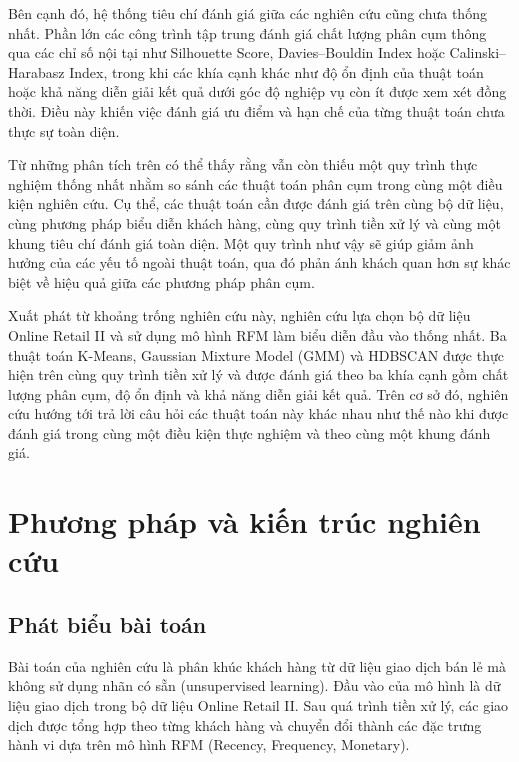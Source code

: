 \documentclass[12pt]{ai_conquer2026}
\begin{document}
Bên cạnh đó, hệ thống tiêu chí đánh giá giữa các nghiên cứu cũng chưa thống nhất. Phần lớn các công trình tập trung đánh giá chất lượng phân cụm thông qua các chỉ số nội tại như Silhouette Score, Davies--Bouldin Index hoặc Calinski--Harabasz Index, trong khi các khía cạnh khác như độ ổn định của thuật toán hoặc khả năng diễn giải kết quả dưới góc độ nghiệp vụ còn ít được xem xét đồng thời. Điều này khiến việc đánh giá ưu điểm và hạn chế của từng thuật toán chưa thực sự toàn diện.

Từ những phân tích trên có thể thấy rằng vẫn còn thiếu một quy trình thực nghiệm thống nhất nhằm so sánh các thuật toán phân cụm trong cùng một điều kiện nghiên cứu. Cụ thể, các thuật toán cần được đánh giá trên cùng bộ dữ liệu, cùng phương pháp biểu diễn khách hàng, cùng quy trình tiền xử lý và cùng một khung tiêu chí đánh giá toàn diện. Một quy trình như vậy sẽ giúp giảm ảnh hưởng của các yếu tố ngoài thuật toán, qua đó phản ánh khách quan hơn sự khác biệt về hiệu quả giữa các phương pháp phân cụm.

Xuất phát từ khoảng trống nghiên cứu này, nghiên cứu lựa chọn bộ dữ liệu Online Retail II và sử dụng mô hình RFM làm biểu diễn đầu vào thống nhất. Ba thuật toán K-Means, Gaussian Mixture Model (GMM) và HDBSCAN được thực hiện trên cùng quy trình tiền xử lý và được đánh giá theo ba khía cạnh gồm chất lượng phân cụm, độ ổn định và khả năng diễn giải kết quả. Trên cơ sở đó, nghiên cứu hướng tới trả lời câu hỏi các thuật toán này khác nhau như thế nào khi được đánh giá trong cùng một điều kiện thực nghiệm và theo cùng một khung đánh giá.

\section{Phương pháp và kiến trúc nghiên cứu}

\subsection{Phát biểu bài toán}

Bài toán của nghiên cứu là phân khúc khách hàng từ dữ liệu giao dịch bán lẻ mà không sử dụng nhãn có sẵn (unsupervised learning). Đầu vào của mô hình là dữ liệu giao dịch trong bộ dữ liệu Online Retail II. Sau quá trình tiền xử lý, các giao dịch được tổng hợp theo từng khách hàng và chuyển đổi thành các đặc trưng hành vi dựa trên mô hình RFM (Recency, Frequency, Monetary).
\end{document}

